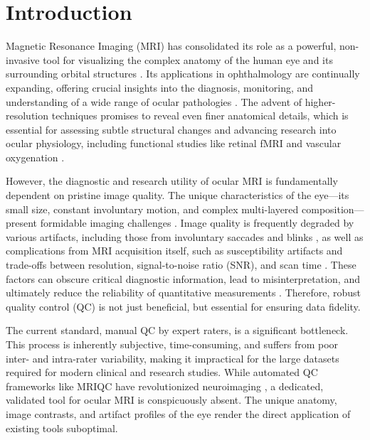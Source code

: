 \chapter{Introduction}
\label{chap:introduction}

Magnetic Resonance Imaging (MRI) has consolidated its role as a powerful, non-invasive tool for visualizing the complex anatomy of the human eye and its surrounding orbital structures \cite{townsend_clinical_2008, fanea_review_2012}. Its applications in ophthalmology are continually expanding, offering crucial insights into the diagnosis, monitoring, and understanding of a wide range of ocular pathologies \cite{duong_magnetic_2014, niendorf_ophthalmic_2021}. The advent of higher-resolution techniques promises to reveal even finer anatomical details, which is essential for assessing subtle structural changes and advancing research into ocular physiology, including functional studies like retinal fMRI and vascular oxygenation \cite{duong_functional_2002, zhang_magnetic_2011}.

However, the diagnostic and research utility of ocular MRI is fundamentally dependent on pristine image quality. The unique characteristics of the eye—its small size, constant involuntary motion, and complex multi-layered composition—present formidable imaging challenges \cite{fanea_review_2012, duong_magnetic_2014}. Image quality is frequently degraded by various artifacts, including those from involuntary saccades and blinks \cite{franceschiello_3-dimensional_2020}, as well as complications from MRI acquisition itself, such as susceptibility artifacts and trade-offs between resolution, signal-to-noise ratio (SNR), and scan time \cite{niendorf_ophthalmic_2021}. These factors can obscure critical diagnostic information, lead to misinterpretation, and ultimately reduce the reliability of quantitative measurements \cite{schmidt_association_2019}. Therefore, robust quality control (QC) is not just beneficial, but essential for ensuring data fidelity.

The current standard, manual QC by expert raters, is a significant bottleneck. This process is inherently subjective, time-consuming, and suffers from poor inter- and intra-rater variability, making it impractical for the large datasets required for modern clinical and research studies. While automated QC frameworks like MRIQC have revolutionized neuroimaging \cite{esteban_mriqc_2017}, a dedicated, validated tool for ocular MRI is conspicuously absent. The unique anatomy, image contrasts, and artifact profiles of the eye render the direct application of existing tools suboptimal.


